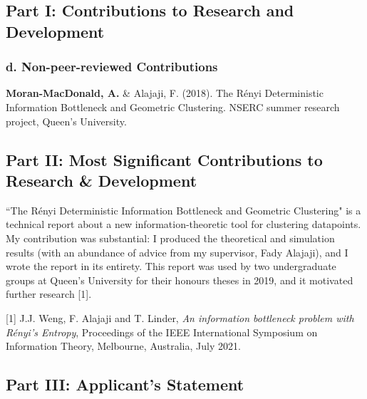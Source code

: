 \documentclass[a4paper,12pt]{article}
\begin{document}
\subsection*{Part I: Contributions to Research and Development}
\subsubsection*{d. Non-peer-reviewed Contributions}
\textbf{Moran-MacDonald, A.} \& Alajaji, F. (2018). The R\'{e}nyi Deterministic
Information Bottleneck and Geometric Clustering. NSERC summer research project,
Queen's University.

\subsection*{Part II: Most Significant Contributions to Research \& Development}
``The R\'{e}nyi Deterministic Information Bottleneck and Geometric
Clustering" is a technical report about a new information-theoretic tool for
clustering datapoints.
My contribution was substantial: I produced the theoretical and simulation
results (with an abundance of advice from my supervisor, Fady Alajaji), and I
wrote the report in its entirety.
This report was used by two undergraduate groups at Queen's University for their
honours theses in 2019, and it motivated further research [1].

[1] J.J. Weng, F. Alajaji and T. Linder, \textit{An information bottleneck
problem with R\'{e}nyi's Entropy}, Proceedings of the IEEE International
Symposium on Information Theory, Melbourne, Australia, July 2021.

\subsection*{Part III: Applicant's Statement}
\end{document}
